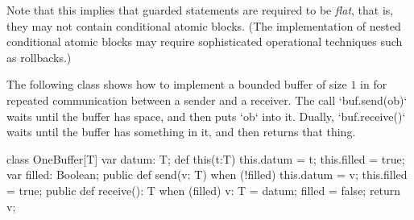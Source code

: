 Note that this implies that guarded statements are required to be {\em
flat}, that is, they may not contain conditional atomic blocks. (The
implementation of nested conditional atomic blocks may require
sophisticated operational techniques such as rollbacks.)


\begin{example}
The following class shows how to implement a bounded buffer of size
$1$ in \Xten{} for repeated communication between a sender and a
receiver.  The call \xcd`buf.send(ob)` waits until the buffer has space, and
then puts \xcd`ob` into it.  Dually, \xcd`buf.receive()` waits until the
buffer has something in it, and then returns that thing.


\begin{xten}
class OneBuffer[T] {
  var datum: T;
  def this(t:T) { this.datum = t; this.filled = true; }
  var filled: Boolean;
  public def send(v: T) {
    when (!filled) {
      this.datum = v;
      this.filled = true;
    }
  }
  public def receive(): T {
    when (filled) {
      v: T = datum;
      filled = false;
      return v;
    }
  }
}
\end{xten}
%
\end{example}

